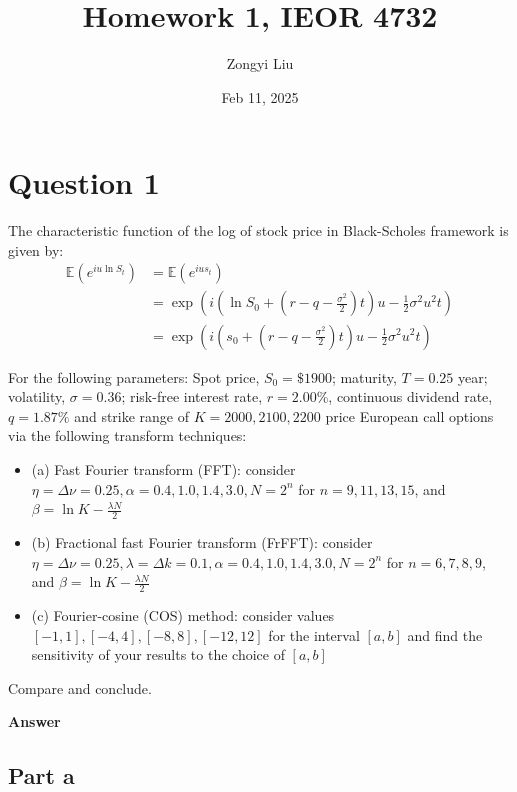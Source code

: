 \documentclass[letterpaper]{article}
\title{Homework 1, IEOR 4732}
\author{Zongyi Liu}
\date{Feb 11, 2025}
\begin{document}
		\maketitle
		
		\section{Question 1}
		 The characteristic function of the log of stock price in Black-Scholes framework is given by:
		$$
		\begin{aligned}
			\mathbb{E}\left(e^{i u \ln S_t}\right) & =\mathbb{E}\left(e^{i u s_t}\right) \\
			& =\exp \left(i\left(\ln S_0+\left(r-q-\frac{\sigma^2}{2}\right) t\right) u-\frac{1}{2} \sigma^2 u^2 t\right) \\
			& =\exp \left(i\left(s_0+\left(r-q-\frac{\sigma^2}{2}\right) t\right) u-\frac{1}{2} \sigma^2 u^2 t\right)
		\end{aligned}
		$$
		
		For the following parameters:
		Spot price, $S_0=\$ 1900$; maturity, $T=0.25$ year; volatility, $\sigma=0.36$; risk-free interest rate, $r=2.00 \%$, continuous dividend rate, $q=1.87 \%$ and strike range of $K=2000,2100,2200$ price European call options via the following transform techniques:
		
		\begin{itemize}
		\item 	(a) Fast Fourier transform (FFT): consider $\eta=\Delta \nu=0.25, \alpha=0.4,1.0,1.4,3.0, N=2^n$ for $n=9,11,13,15$, and $\beta=\ln K-\frac{\lambda N}{2}$
		\item 	(b) Fractional fast Fourier transform (FrFFT): consider $\eta=\Delta \nu=0.25, \lambda=\Delta k=0.1, \alpha=0.4,1.0,1.4,3.0, N=2^n$ for $n=6,7,8,9$, and $\beta=\ln K-\frac{\lambda N}{2}$
		\item 	(c) Fourier-cosine (COS) method: consider values $[-1,1],[-4,4],[-8,8],[-12,12]$ for the interval $[a, b]$ and find the sensitivity of your results to the choice of $[a, b]$
		\end{itemize}
		
		Compare and conclude.

	\textbf{Answer}
	
	  \subsection{Part a}
	  
\end{document}

